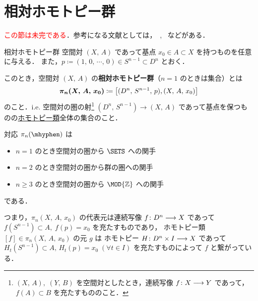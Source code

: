 \documentclass[algtopo_main]{subfiles}
\begin{document}

\section{相対ホモトピー群}

\textcolor{red}{この節は未完である}．参考になる文献としては，~\cite[ChapterIV]{Whitehead}, ~\cite[Chap 7]{Spanier}などがある．

\begin{mydef}[label=def:rel-homotopy-group]{相対ホモトピー群}
    空間対 $(X,\, A)$ であって基点 $x_0 \in A \subset X$ を持つものを任意に与える．
    また，$p \coloneqq (1,\, 0,\, \cdots ,\, 0) \in S^{n-1} \subset D^n$ とおく．
    
    このとき，空間対 $(X,\, A)$ の\textbf{相対ホモトピー群}（$n=1$ のときは集合）とは
    \begin{align}
        \bm{\pi_n (X,\, A,\, x_0)} \coloneqq \comm{(D^n,\, S^{n-1},\, p)}{(X,\, A,\, x_0)}
    \end{align}
    のこと．i.e. 空間対の圏の射\footnote{$(X,\, A),\; (Y,\, B)$ を空間対としたとき，連続写像 $f \colon X \longrightarrow Y$ であって，$f (A) \subset B$ を充たすもののこと．}
    $(D^n,\, S^{n-1}) \to (X,\, A)$ であって基点を保つものの\hyperref[def:homotopy-basic]{ホモトピー類}全体の集合のこと．
\end{mydef}

\begin{marker}
    対応 $\pi_n (\mhyphen)$ は
    \begin{itemize}
        \item $n=1$ のとき空間対の圏から $\SETS$ への関手
        \item $n=2$ のとき空間対の圏から群の圏への関手
        \item $n\ge 3$ のとき空間対の圏から $\MOD{\mathbb{Z}}$ への関手
    \end{itemize}
    である．
\end{marker}

つまり，$\pi_n(X,\, A,\, x_0)$ の代表元は連続写像 $f \colon D^n \longrightarrow X$ であって $f(S^{n-1}) \subset A,\; f(p) = x_0$ を充たすものであり，
ホモトピー類 $[f] \in \pi_n(X,\, A,\, x_0)$ の元 $g$ は
ホモトピー $H \colon D^n \times I \longrightarrow X$ であって $H_t(S^{n-1}) \subset A,\, H_t(p) = x_0\; (\forall t \in I)$ を充たすものによって $f$ と繋がっている．
\end{document}
